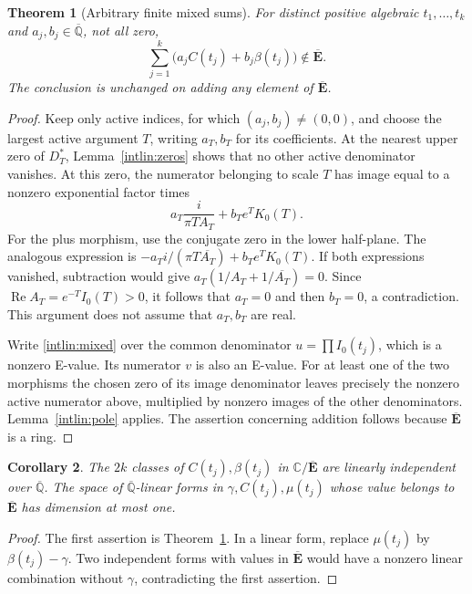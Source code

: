 \documentclass[11pt]{article}
\newtheorem{theorem}{Theorem}[section]
\newtheorem{corollary}[theorem]{Corollary}
\theoremstyle{definition}
\theoremstyle{remark}
\newcommand{\Qa}{\overline{\mathbb Q}}
\newcommand{\Ebar}{\overline{\mathbf E}}
\begin{document}
\begin{theorem}[Arbitrary finite mixed sums]\label{thm:poles}
For distinct positive algebraic $t_1,\ldots,t_k$ and
$a_j,b_j\in\Qa$, not all zero,
\begin{equation}\label{intlin:mixed}
\sum_{j=1}^k\bigl(a_jC(t_j)+b_j\beta(t_j)\bigr)\notin\Ebar.
\end{equation}
The conclusion is unchanged on adding any element of $\Ebar$.
\end{theorem}
\begin{proof}
Keep only active indices, for which $(a_j,b_j)\ne(0,0)$, and choose
the largest active argument $T$, writing $a_T,b_T$ for its coefficients.
At the nearest upper zero of
$D_T^*$, Lemma~\ref{intlin:zeros} shows that no other active denominator
vanishes. At this zero, the numerator belonging to scale $T$ has image
equal to a nonzero exponential factor times
\begin{equation}\label{intlin:residues}
a_T\frac{i}{\pi T A_T}+b_Te^TK_0(T).
\end{equation}
For the plus morphism, use the conjugate zero in the lower half-plane.
The analogous expression is
$-a_Ti/(\pi T\overline{A_T})+b_Te^TK_0(T)$.
If both expressions vanished, subtraction would give
$a_T(1/A_T+1/\overline{A_T})=0$. Since
$\operatorname{Re}A_T=e^{-T}I_0(T)>0$, it follows that $a_T=0$
and then $b_T=0$, a contradiction. This argument does not assume
that $a_T,b_T$ are real.

Write \eqref{intlin:mixed} over the common denominator
$u=\prod I_0(t_j)$, which is a nonzero E-value. Its numerator $v$
is also an E-value. For at least one of the two morphisms the chosen
zero of its image denominator leaves precisely the nonzero active
numerator above, multiplied by nonzero images of the other denominators.
Lemma~\ref{intlin:pole} applies. The assertion concerning addition follows
because $\Ebar$ is a ring.
\end{proof}

\begin{corollary}\label{cor:integralrank}
The $2k$ classes of $C(t_j),\beta(t_j)$ in $\mathbb C/\Ebar$ are linearly
independent over $\Qa$. The space of $\Qa$-linear forms in
$\gamma,C(t_j),\mu(t_j)$ whose value belongs to $\Ebar$ has dimension
at most one.
\end{corollary}
\begin{proof}
The first assertion is Theorem~\ref{thm:poles}. In a linear form,
replace $\mu(t_j)$ by $\beta(t_j)-\gamma$. Two independent forms
with values in $\Ebar$ would have a nonzero linear combination without
$\gamma$, contradicting the first assertion.
\end{proof}
\end{document}

